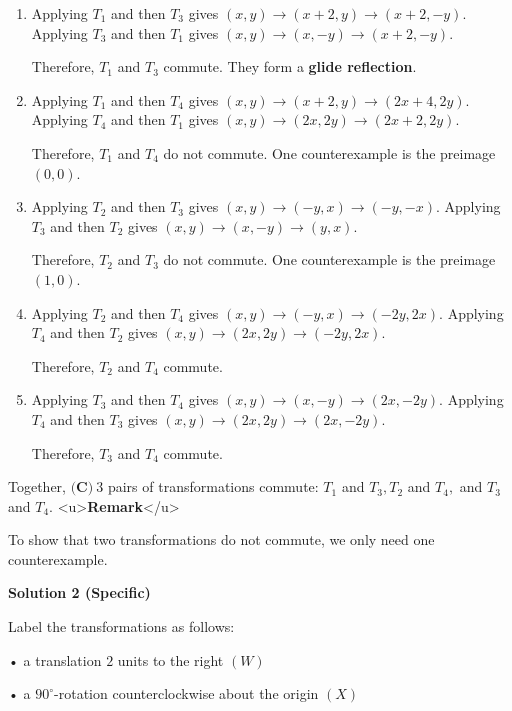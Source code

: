 \begin{enumerate}
\begin{enumerate}
        \item Applying $T_1$ and then $T_3$ gives $(x,y)\to(x+2,y)\to(x+2,-y).$ Applying $T_3$ and then $T_1$ gives $(x,y)\to(x,-y)\to(x+2,-y).$ 

 Therefore, $T_1$ and $T_3$ commute. They form a \textbf{glide reflection}.

 

        \item Applying $T_1$ and then $T_4$ gives $(x,y)\to(x+2,y)\to(2x+4,2y).$ Applying $T_4$ and then $T_1$ gives $(x,y)\to(2x,2y)\to(2x+2,2y).$ 

 Therefore, $T_1$ and $T_4$ do not commute. One counterexample is the preimage $(0,0).$


        \item Applying $T_2$ and then $T_3$ gives $(x,y)\to(-y,x)\to(-y,-x).$ Applying $T_3$ and then $T_2$ gives $(x,y)\to(x,-y)\to(y,x).$ 

 Therefore, $T_2$ and $T_3$ do not commute. One counterexample is the preimage $(1,0).$


        \item Applying $T_2$ and then $T_4$ gives $(x,y)\to(-y,x)\to(-2y,2x).$ Applying $T_4$ and then $T_2$ gives $(x,y)\to(2x,2y)\to(-2y,2x).$ 

 Therefore, $T_2$ and $T_4$ commute.

 

        \item Applying $T_3$ and then $T_4$ gives $(x,y)\to(x,-y)\to(2x,-2y).$ Applying $T_4$ and then $T_3$ gives $(x,y)\to(2x,2y)\to(2x,-2y).$ 

 Therefore, $T_3$ and $T_4$ commute.

 

            \end{enumerate}
            Together, $\boxed{\textbf{(C)}~3}$ pairs of transformations commute: $T_1$ and $T_3, T_2$ and $T_4,$ and $T_3$ and $T_4.$
<u>\textbf{Remark}</u>

 To show that two transformations do not commute, we only need one counterexample.

 



\textbf{Solution 2 (Specific)}

Label the transformations as follows:

 • a translation $2$ units to the right $(W)$

 • a $90^{\circ}$-rotation counterclockwise about the origin $(X)$


\end{enumerate}
